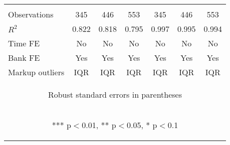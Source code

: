 \documentclass[]{article}
\begin{document}
\begin{center}
\begin{tabular}{lcccccc}
\vspace{4pt} & \begin{footnotesize}\end{footnotesize} & \begin{footnotesize}\end{footnotesize} & \begin{footnotesize}\end{footnotesize} & \begin{footnotesize}\end{footnotesize} & \begin{footnotesize}\end{footnotesize} & \begin{footnotesize}\end{footnotesize} \\
Observations & 345 & 446 & 553 & 345 & 446 & 553 \\
$R^2$ & 0.822 & 0.818 & 0.795 & 0.997 & 0.995 & 0.994 \\
Time FE & No & No & No & No & No & No \\
Bank FE & Yes & Yes & Yes & Yes & Yes & Yes \\
 Markup outliers & IQR & IQR & IQR & IQR & IQR & IQR \\ \hline
\multicolumn{7}{c}{\begin{footnotesize} Robust standard errors in parentheses\end{footnotesize}} \\
\multicolumn{7}{c}{\begin{footnotesize} *** p$<$0.01, ** p$<$0.05, * p$<$0.1\end{footnotesize}} \\
\end{tabular}
\end{center}
\end{document}
